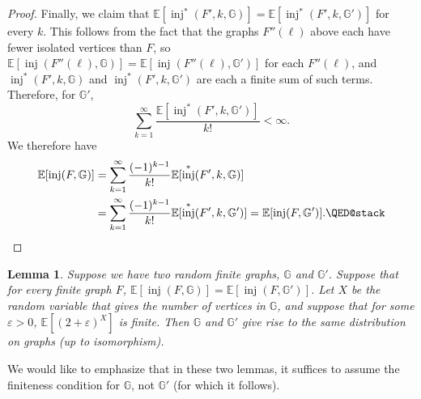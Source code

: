 \documentclass{amsart}
\numberwithin{equation}{section}
\numberwithin{figure}{section}
\newtheorem{lemma}[theorem]{Lemma}
\theoremstyle{definition}
\theoremstyle{remark}
\DeclareMathOperator{\inj}{inj}
\newcommand{\EE}{\mathbb{E}}
\begin{document}
\begin{proof}
Finally, we claim that
$\EE[\inj^*(F',k,\mathbb{G})]=\EE[\inj^*(F',k,\mathbb{G}')]$ for every $k$.
This follows from the fact that the graphs $F''(\ell)$ above each have fewer
isolated vertices than $F$, so
$\EE[\inj(F''(\ell),\mathbb{G})]=\EE[\inj(F''(\ell),\mathbb{G}')]$ for each
$F''(\ell)$, and $\inj^*(F',k, \mathbb{G})$ and $\inj^*(F',k, \mathbb{G}')$
are each a finite sum of such terms. Therefore, for $\mathbb{G}'$,
\[\sum_{k=1}^\infty \frac{\EE[\inj^*(F',k,\mathbb{G}')]}{k!}<\infty.
\]
We therefore have
\begin{align*}
\EE[\inj(F,\mathbb{G})]&=\sum_{k=1}^\infty \frac{(-1)^{k-1}}{k!}\EE[\inj^*(F',k,\mathbb{G})]\\
&=\sum_{k=1}^\infty \frac{(-1)^{k-1}}{k!}\EE[\inj^*(F',k,\mathbb{G}')]
=\EE[\inj(F,\mathbb{G}')]
. \qedhere
\end{align*}
\end{proof}

\begin{lemma} \label{lemmainjequalsamedist}
Suppose we have two random finite graphs, $\mathbb{G}$ and $\mathbb{G}'$.
Suppose that for every finite graph $F$,
$\EE[\inj(F,\mathbb{G})]=\EE[\inj(F,\mathbb{G}')]$. Let $X$ be the random
variable that gives the number of vertices in $\mathbb{G}$, and suppose that
for some $\varepsilon>0$, $\EE[(2+\varepsilon)^X]$ is finite. Then
$\mathbb{G}$ and $\mathbb{G}'$ give rise to the same distribution on graphs
(up to isomorphism).
\end{lemma}

We would like to emphasize that in these two lemmas, it suffices to assume
the finiteness condition for $\mathbb{G}$, not $\mathbb{G}'$ (for which it
follows).
\end{document}
